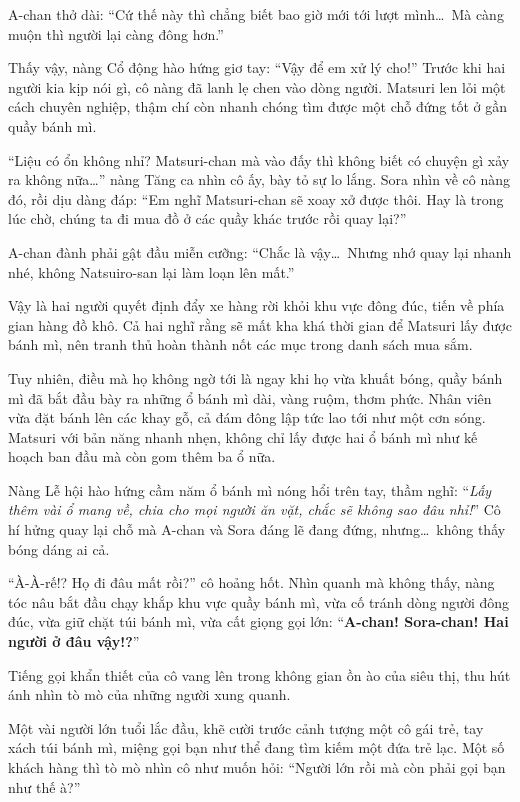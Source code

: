 \documentclass[../main.tex]{subfiles}
\begin{document}
A-chan thở dài: ``Cứ thế này thì chẳng biết bao giờ mới tới lượt mình\dots\ Mà càng muộn thì người lại càng đông hơn.''

Thấy vậy, nàng Cổ động hào hứng giơ tay: ``Vậy để em xử lý cho!'' Trước khi hai người kia kịp nói gì, cô nàng đã lanh lẹ chen vào dòng người. Matsuri len lỏi một cách chuyên nghiệp, thậm chí còn nhanh chóng tìm được một chỗ đứng tốt ở gần quầy bánh mì.

``Liệu có ổn không nhỉ? Matsuri-chan mà vào đấy thì không biết có chuyện gì xảy ra không nữa\dots'' nàng Tăng ca nhìn cô ấy, bày tỏ sự lo lắng. Sora nhìn về cô nàng đó, rồi dịu dàng đáp: ``Em nghĩ Matsuri-chan sẽ xoay xở được thôi. Hay là trong lúc chờ, chúng ta đi mua đồ ở các quầy khác trước rồi quay lại?''

A-chan đành phải gật đầu miễn cưỡng: ``Chắc là vậy\dots\ Nhưng nhớ quay lại nhanh nhé, không Natsuiro-san lại làm loạn lên mất.''

Vậy là hai người quyết định đẩy xe hàng rời khỏi khu vực đông đúc, tiến về phía gian hàng đồ khô. Cả hai nghĩ rằng sẽ mất kha khá thời gian để Matsuri lấy được bánh mì, nên tranh thủ hoàn thành nốt các mục trong danh sách mua sắm.

Tuy nhiên, điều mà họ không ngờ tới là ngay khi họ vừa khuất bóng, quầy bánh mì đã bắt đầu bày ra những ổ bánh mì dài, vàng ruộm, thơm phức. Nhân viên vừa đặt bánh lên các khay gỗ, cả đám đông lập tức lao tới như một cơn sóng. Matsuri với bản năng nhanh nhẹn, không chỉ lấy được hai ổ bánh mì như kế hoạch ban đầu mà còn gom thêm ba ổ nữa.

Nàng Lễ hội hào hứng cầm năm ổ bánh mì nóng hổi trên tay, thầm nghĩ: ``\textit{Lấy thêm vài ổ mang về, chia cho mọi người ăn vặt, chắc sẽ không sao đâu nhỉ!}'' Cô hí hửng quay lại chỗ mà A-chan và Sora đáng lẽ đang đứng, nhưng\dots\ không thấy bóng dáng ai cả.

``À-À-rế!? Họ đi đâu mất rồi?'' cô hoảng hốt. Nhìn quanh mà không thấy, nàng tóc nâu bắt đầu chạy khắp khu vực quầy bánh mì, vừa cố tránh dòng người đông đúc, vừa giữ chặt túi bánh mì, vừa cất giọng gọi lớn: ``\textbf{A-chan! Sora-chan! Hai người ở đâu vậy!?}''

Tiếng gọi khẩn thiết của cô vang lên trong không gian ồn ào của siêu thị, thu hút ánh nhìn tò mò của những người xung quanh.

Một vài người lớn tuổi lắc đầu, khẽ cười trước cảnh tượng một cô gái trẻ, tay xách túi bánh mì, miệng gọi bạn như thể đang tìm kiếm một đứa trẻ lạc. Một số khách hàng thì tò mò nhìn cô như muốn hỏi: ``Người lớn rồi mà còn phải gọi bạn như thế à?''
\end{document}
